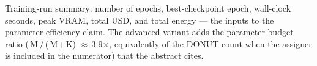 \begin{table}[t]
\centering
\caption{Training-run summary: number of epochs, best-checkpoint
         epoch, wall-clock seconds, peak VRAM, total USD, and total
         energy --- the inputs to the parameter-efficiency claim.
         The advanced variant adds the parameter-budget ratio
         (\,M\,/\,(\,M$+$\,K)
         $\approx$\,3.9$\times$, equivalently
          of the DONUT count when the
         assigner is included in the numerator)
         that the abstract cites.}
\label{tab:training}
\small
{}
\end{table}
